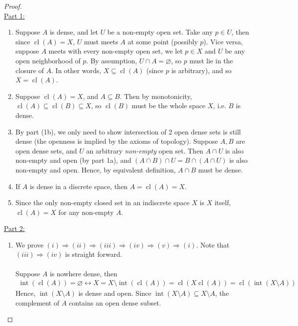 \documentclass{treatise}
\begin{document}
\begin{proof} \ \\
\underline{Part 1:}
\begin{enumerate}[label=(\alph*)]
    \item Suppose $A$ is dense, and let $U$ be a non-empty open set. Take any $p \in U$, then since $\operatorname{cl}(A) = X$, $U$ must meets $A$ at some point (possibly $p$). Vice versa, suppose $A$ meets with every non-empty open set, we let $p \in X$ and $U$ be any open neighborhood of $p$. By assumption, $U \cap A = \varnothing$, so $p$ must lie in the closure of $A$. In other words, $X \subseteq \operatorname{cl}(A)$ (since $p$ is arbitrary), and so $X = \operatorname{cl}(A)$.
    \item Suppose $\operatorname{cl}(A) = X$, and $A \subseteq B$. Then by monotonicity, $\operatorname{cl}(A) \subseteq \operatorname{cl}(B) \subseteq X$, so $\operatorname{cl}(B)$ must be the whole space $X$, i.e. $B$ is dense.
    \item By part (1b), we only need to show intersection of 2 open dense sets is still dense (the openness is implied by the axioms of topology). Suppose $A, B$ are open dense sets, and $U$ an arbitrary \textit{non-empty} open set. Then $A \cap U$ is also non-empty and open (by part 1a), and $(A \cap B) \cap U = B \cap (A \cap U)$ is also non-empty and open. Hence, by equivalent definition, $A \cap B$ must be dense.
    \item If $A$ is dense in a discrete space, then $A = \operatorname{cl}(A) = X$.
    \item Since the only non-empty closed set in an indiscrete space $X$ is $X$ itself, $\operatorname{cl}(A) = X$ for any non-empty $A$.
\end{enumerate}
\underline{Part 2:}
\begin{enumerate}[label=(\alph*)]
    \item We prove $(i) \Rightarrow (ii) \Rightarrow (iii) \Rightarrow (iv) \Rightarrow (v) \Rightarrow (i)$. Note that $(iii) \Rightarrow (iv)$ is straight forward.
    \\
    \\
    Suppose $A$ is nowhere dense, then
    \begin{align*}
        \operatorname{int}(\operatorname{cl}(A)) = \varnothing \leftrightarrow X = X \setminus \operatorname{int}(\operatorname{cl}(A)) = \operatorname{cl}(X \operatorname{cl}(A)) = \operatorname{cl}(\operatorname{int}(X \setminus A))
    \end{align*}
    Hence, $\operatorname{int}(X \setminus A)$ is dense and open. Since $\operatorname{int}(X \setminus A) \subseteq X \setminus A$, the complement of $A$ contains an open dense subset.

\end{enumerate}
\end{proof}
\end{document}
